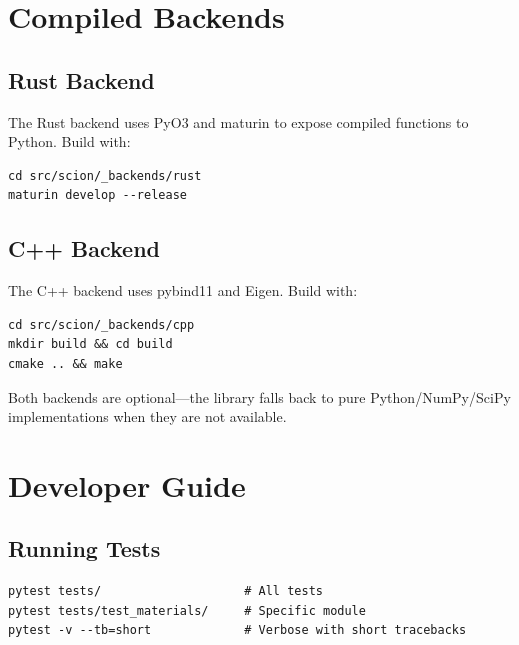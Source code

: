 \documentclass[11pt,a4paper]{report}
\begin{document}
\chapter{Compiled Backends}

\section{Rust Backend}

The Rust backend uses PyO3 and maturin to expose compiled functions to Python. Build with:

\begin{lstlisting}[style=bash]
cd src/scion/_backends/rust
maturin develop --release
\end{lstlisting}

\section{C++ Backend}

The C++ backend uses pybind11 and Eigen. Build with:

\begin{lstlisting}[style=bash]
cd src/scion/_backends/cpp
mkdir build && cd build
cmake .. && make
\end{lstlisting}

Both backends are optional---the library falls back to pure Python/NumPy/SciPy implementations when they are not available.

\chapter{Developer Guide}

\section{Running Tests}

\begin{lstlisting}[style=bash]
pytest tests/                    # All tests
pytest tests/test_materials/     # Specific module
pytest -v --tb=short             # Verbose with short tracebacks
\end{lstlisting}
\end{document}

